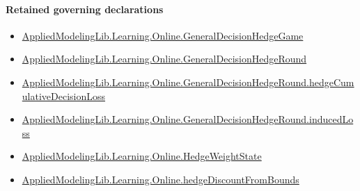 \documentclass[10pt]{article}
\begin{document}
\paragraph{Retained governing declarations}
\begin{itemize}\raggedright
\item \hyperlink{library-prerequisite-34621c1fa332891f}{Applied\allowbreak{}Modeling\allowbreak{}Lib.\allowbreak{}Learning.\allowbreak{}Online.\allowbreak{}General\allowbreak{}Decision\allowbreak{}Hedge\allowbreak{}Game}
\item \hyperlink{library-prerequisite-578531041bcdb501}{Applied\allowbreak{}Modeling\allowbreak{}Lib.\allowbreak{}Learning.\allowbreak{}Online.\allowbreak{}General\allowbreak{}Decision\allowbreak{}Hedge\allowbreak{}Round}
\item \hyperlink{library-prerequisite-12ac34c217dfdfb1}{Applied\allowbreak{}Modeling\allowbreak{}Lib.\allowbreak{}Learning.\allowbreak{}Online.\allowbreak{}General\allowbreak{}Decision\allowbreak{}Hedge\allowbreak{}Round.\allowbreak{}hedge\allowbreak{}Cumulative\allowbreak{}Decision\allowbreak{}Loss}
\item \hyperlink{governing-declaration-1d55aa1d8d711074}{Applied\allowbreak{}Modeling\allowbreak{}Lib.\allowbreak{}Learning.\allowbreak{}Online.\allowbreak{}General\allowbreak{}Decision\allowbreak{}Hedge\allowbreak{}Round.\allowbreak{}induced\allowbreak{}Loss}
\item \hyperlink{library-prerequisite-8196082d02788389}{Applied\allowbreak{}Modeling\allowbreak{}Lib.\allowbreak{}Learning.\allowbreak{}Online.\allowbreak{}Hedge\allowbreak{}Weight\allowbreak{}State}
\item \hyperlink{governing-declaration-a07bebfff75a6e6f}{Applied\allowbreak{}Modeling\allowbreak{}Lib.\allowbreak{}Learning.\allowbreak{}Online.\allowbreak{}hedge\allowbreak{}Discount\allowbreak{}From\allowbreak{}Bounds}
\end{itemize}
\end{document}
